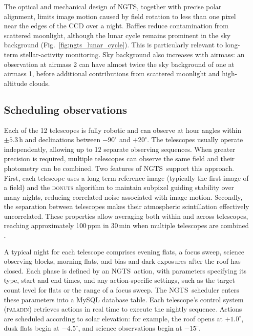 \documentclass[fleqn,usenatbib]{mnras}
\newcommand{\ngts}{{NGTS}}
\begin{document}
The optical and mechanical design of \ngts, together with precise polar alignment, limits image motion caused by field rotation to less than one pixel near the edges of the CCD over a night. Baffles reduce contamination from scattered moonlight, although the lunar cycle remains prominent in the sky background (Fig.~\ref{fig:ngts_lunar_cycle}). This is particularly relevant to long-term stellar-activity monitoring. Sky background also increases with airmass: an observation at airmass 2 can have almost twice the sky background of one at airmass 1, before additional contributions from scattered moonlight and high-altitude clouds.

\subsection{Scheduling observations}

Each of the 12 telescopes is fully robotic and can observe at hour angles within $\pm5.3$\,h and declinations between $-90^{\circ}$ and $+20^{\circ}$. The telescopes usually operate independently, allowing up to 12 separate observing sequences. When greater precision is required, multiple telescopes can observe the same field and their photometry can be combined. Two features of \ngts\ support this approach. First, each telescope uses a long-term reference image (typically the first image of a field) and the \textsc{donuts} algorithm \citep{2013PASP..125..548M} to maintain subpixel guiding stability over many nights, reducing correlated noise associated with image motion. Secondly, the separation between telescopes makes their atmospheric scintillation effectively uncorrelated. These properties allow averaging both within and across telescopes, reaching approximately 100\,ppm in 30\,min when multiple telescopes are combined \citep{2020MNRAS.494.5872B}.

A typical night for each telescope comprises evening flats, a focus sweep, science observing blocks, morning flats, and bias and dark exposures after the roof has closed. Each phase is defined by an \ngts\ action, with parameters specifying its type, start and end times, and any action-specific settings, such as the target count level for flats or the range of a focus sweep. The \ngts\ scheduler enters these parameters into a MySQL database table. Each telescope's control system (\textsc{paladin}) retrieves actions in real time to execute the nightly sequence. Actions are scheduled according to solar elevation: for example, the roof opens at $+1.0^{\circ}$, dusk flats begin at $-4.5^{\circ}$, and science observations begin at $-15^{\circ}$.
\end{document}
